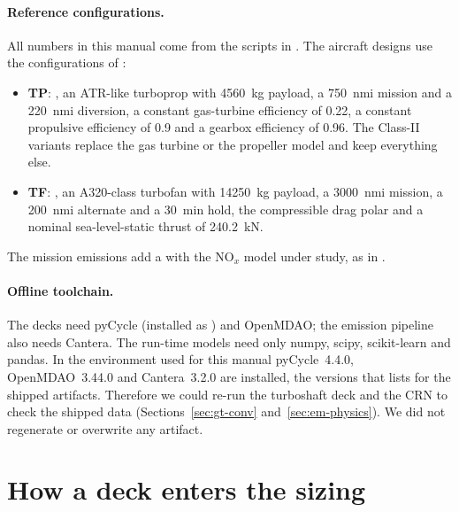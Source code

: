\documentclass[a4paper,11pt]{article}
\begin{document}
\paragraph{Reference configurations.} All numbers in this manual come from the scripts in
. The aircraft designs use the configurations of
:
\begin{itemize}
\item \textbf{TP}: , an ATR-like turboprop with \SI{4560}{kg}
  payload, a \SI{750}{nmi} mission and a \SI{220}{nmi} diversion, a constant gas-turbine
  efficiency of 0.22, a constant propulsive efficiency of 0.9 and a gearbox efficiency of 0.96.
  The Class-II variants replace the gas turbine or the propeller model and keep everything else.
\item \textbf{TF}: , an A320-class turbofan with \SI{14250}{kg}
  payload, a \SI{3000}{nmi} mission, a \SI{200}{nmi} alternate and a \SI{30}{min} hold, the
  compressible drag polar and a nominal sea-level-static thrust of \SI{240.2}{kN}.
\end{itemize}
The mission emissions add a  with the NO$_x$
model under study, as in .

\paragraph{Offline toolchain.} The decks need pyCycle (installed as ) and
OpenMDAO; the emission pipeline also needs Cantera. The run-time models need only numpy, scipy,
scikit-learn and pandas. In the environment used for this manual pyCycle~4.4.0,
OpenMDAO~3.44.0 and Cantera~3.2.0 are installed, the versions that
 lists for the shipped artifacts. Therefore we could re-run the
turboshaft deck and the CRN to check the shipped data (Sections~\ref{sec:gt-conv}
and~\ref{sec:em-physics}). We did not regenerate or overwrite any artifact.

\section{How a deck enters the sizing}\label{sec:interface}
\end{document}
